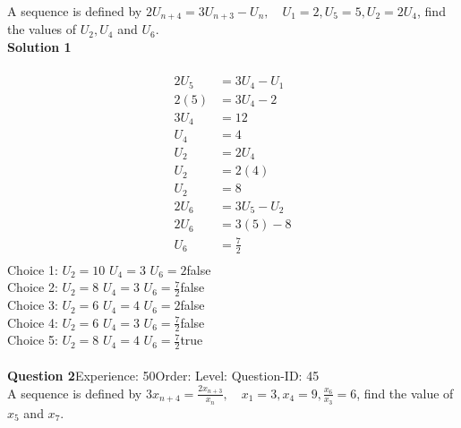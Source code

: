\documentclass{article}
\begin{document}
A sequence is defined by $2U_{n+4}=3U_{n+3}-U_n, \quad U_1=2,U_5=5, U_2=2U_4$, find the values of $U_2,U_4$ and $U_6$.\\[4pt]
\noindent\textbf{Solution 1}\\[2pt]
\\[-35pt]\begin{align*}
2U_5&=3U_4-U_1\\[2pt]
2(5)&=3U_4-2\\[2pt]
3U_4&=12\\[2pt]
U_4&=4\\[12pt]
U_2&=2U_4\\[2pt]
U_2&=2(4)\\[2pt]
U_2&=8\\[12pt]
2U_6&=3U_5-U_2\\[2pt]
2U_6&=3(5)-8\\[2pt]
U_6&=\displaystyle\frac{7}{2}\\
\end{align*}
Choice 1: \hspace{20pt}$U_2=10 \,\, U_4=3 \,\, U_6=2 $\hspace{20pt}false\\
Choice 2: \hspace{20pt}$U_2=8 \,\, U_4=3 \,\, U_6=\displaystyle\frac{7}{2} $\hspace{20pt}false\\
Choice 3: \hspace{20pt}$U_2=6 \,\, U_4=4 \,\, U_6=2 $\hspace{20pt}false\\
Choice 4: \hspace{20pt}$U_2=6 \,\, U_4=3 \,\, U_6=\displaystyle\frac{7}{2} $\hspace{20pt}false\\
Choice 5: \hspace{20pt}$U_2=8 \,\, U_4=4 \,\, U_6=\displaystyle\frac{7}{2} $\hspace{20pt}true\\
\\[4pt]
\noindent\textbf{Question 2}\hspace{20pt}Experience: 50\hspace{20pt}Order: \hspace{20pt}Level: \hspace{20pt}Question-ID: 45\\[2pt]
A sequence is defined by $3x_{n+4}=\displaystyle\frac{2x_{n+3}}{x_n}, \quad x_1=3,x_4=9, \displaystyle\frac{x_6}{x_3}=6$, find the value of $x_5$ and $x_7$.\\[4pt]
\end{document}
